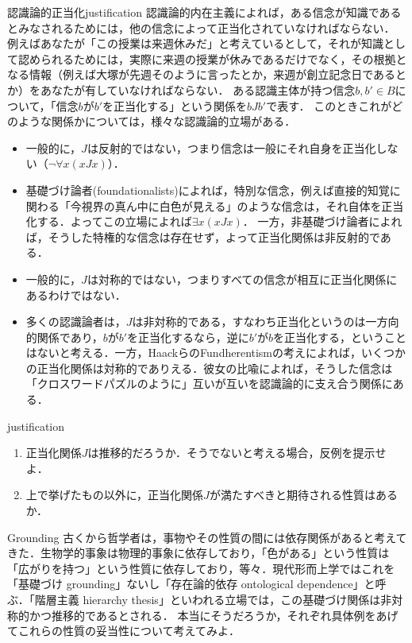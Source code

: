 \documentclass[11pt,a4paper]{bxjsarticle}
\begin{document}
\begin{rei}{認識論的正当化}{justification}
 認識論的内在主義によれば，ある信念が知識であるとみなされるためには，他の信念によって正当化されていなければならない．
 例えばあなたが「この授業は来週休みだ」と考えているとして，それが知識として認められるためには，実際に来週の授業が休みであるだけでなく，その根拠となる情報（例えば大塚が先週そのように言ったとか，来週が創立記念日であるとか）をあなたが有していなければならない．
 ある認識主体が持つ信念$b, b' \in B$について，「信念$b$が$b'$を正当化する」という関係を$bJb'$で表す．
 このときこれがどのような関係かについては，様々な認識論的立場がある．
 \begin{itemize}
  \item 一般的に，$J$は反射的ではない，つまり信念は一般にそれ自身を正当化しない（$\neg \forall x (xJx)$）．
  \item 基礎づけ論者(foundationalists)によれば，特別な信念，例えば直接的知覚に関わる「今視界の真ん中に白色が見える」のような信念は，それ自体を正当化する．よってこの立場によれば$\exists x (xJx)$．
	一方，非基礎づけ論者によれば，そうした特権的な信念は存在せず，よって正当化関係は非反射的である．
  \item 一般的に，$J$は対称的ではない，つまりすべての信念が相互に正当化関係にあるわけではない．
  \item 多くの認識論者は，$J$は非対称的である，すなわち正当化というのは一方向的関係であり，$b$が$b'$を正当化するなら，逆に$b'$が$b$を正当化する，ということはないと考える．一方，HaackらのFundherentismの考えによれば，いくつかの正当化関係は対称的でありえる．彼女の比喩によれば，そうした信念は「クロスワードパズルのように」互いが互いを認識論的に支え合う関係にある．
 \end{itemize}
\end{rei}

\begin{renshu}{}{justification}
\begin{enumerate}
 \item 正当化関係$J$は推移的だろうか．そうでないと考える場合，反例を提示せよ．
 \item 上で挙げたもの以外に，正当化関係$J$が満たすべきと期待される性質はあるか．
\end{enumerate}
\end{renshu}


\begin{rei}{Grounding}{}
 古くから哲学者は，事物やその性質の間には依存関係があると考えてきた．生物学的事象は物理的事象に依存しており，「色がある」という性質は「広がりを持つ」という性質に依存しており，等々．現代形而上学ではこれを「基礎づけ grounding」ないし「存在論的依存 ontological dependence」と呼ぶ．「階層主義 hierarchy thesis」といわれる立場では，この基礎づけ関係は非対称的かつ推移的であるとされる．
本当にそうだろうか，それぞれ具体例をあげてこれらの性質の妥当性について考えてみよ．
\end{rei}
\end{document}
